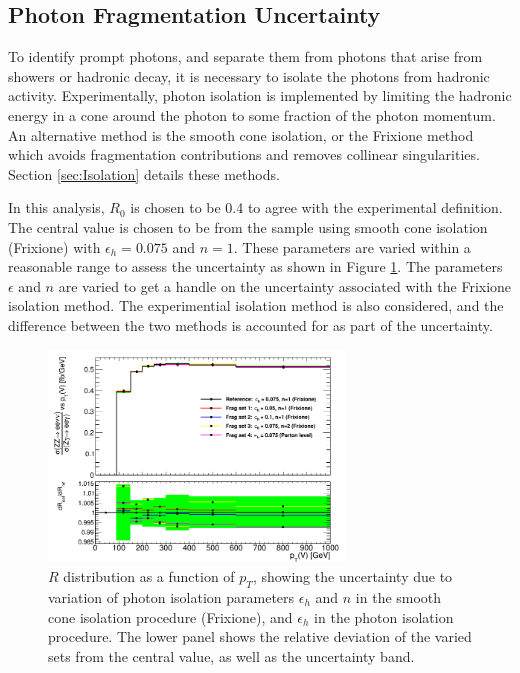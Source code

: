 \documentclass[12pt,a4paper,openright,twoside]{report}
\begin{document}
\subsection{Photon Fragmentation Uncertainty}\label{subsec:photon_fragmentation}

To identify prompt photons, and separate them from photons that arise from showers or hadronic decay, it is necessary to isolate the photons from hadronic activity. Experimentally, photon isolation is implemented by limiting the hadronic energy in a cone around the photon to some fraction of the photon momentum. An alternative method is the smooth cone isolation, or the Frixione method which avoids fragmentation contributions and removes collinear singularities. Section \ref{sec:Isolation} details these methods.

In this analysis, $R_0$ is chosen to be 0.4 to agree with the experimental definition. The central value is chosen to be from the sample using smooth cone isolation (Frixione) with $\epsilon_h = 0.075$ and $n=1$. These parameters are varied within a reasonable range to assess the uncertainty as shown in Figure \ref{fig:photon_frag}. The parameters $\epsilon$ and $n$ are varied to get a handle on the uncertainty associated with the Frixione isolation method. The experimential isolation method is also considered, and the difference between the two methods is accounted for as part of the uncertainty.

\begin{figure}[H]
\centering
	\includegraphics[width=0.7\textwidth]{frag.png}
	\caption{$R$ distribution as a function of $p_T$, showing the uncertainty due to variation of photon isolation parameters $\epsilon_h$ and $n$ in the smooth cone isolation procedure (Frixione), and $\epsilon_h$ in the photon isolation procedure. The lower panel shows the relative deviation of the varied sets from the central value, as well as the uncertainty band.}
	\label{fig:photon_frag}
\end{figure}
\end{document}
